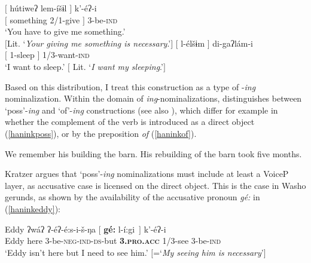 \documentclass[output=paper]{langscibook}
\begin{document}
  \label{haninkgerunds}
 \ea \gll $[$ hútiweʔ lem-íšɨl $]$ k'-éʔ-i\\
$[$ something  2/1-give $]$ 3-be-{\scshape ind}\\
\glt `You have to give me something.' \\ $[$Lit. `{\itshape Your giving me something is necessary}.'$]$ \label{haninkgive}
\vspace{.25em}
 \ex \gll $[$ l-élšɨm $]$ di-gaʔlám-i\\
$[$ 1-sleep $]$ 1/3-want-{\scshape ind}\\
\glt `I want to sleep.' $[$ Lit. `{\itshape I want my sleeping}.'$]$\label{haninksleep}
 \z
 \z 
 
Based on this distribution, I treat this construction as a type of -{\itshape ing} nominalization. Within the domain of {\itshape ing}-nominalizations, \cite{kratzer1996} distinguishes between  `poss'-{\itshape ing} and `of'-{\itshape ing} constructions (see also \citealt{abney1987,alexiadou2005,harley2009}), which differ for example in whether the complement of the verb is introduced as a direct object (\ref{haninkposs}), or by the preposition {\itshape of} (\ref{haninkof}).
 

 \ea  We remember his building the barn. \label{haninkposs} 
 \ex His rebuilding of the barn took five months. \label{haninkof} \hfill \citep[126-127]{kratzer1996}
 \z
 \z
 
Kratzer argues that `poss'-{\itshape ing} nominalizations must include at least a VoiceP layer, as accusative case is licensed on the direct object. This is the case in Washo gerunds, as shown by the availability of the accusative pronoun {\itshape gé:} in (\ref{haninkeddy}):
 
 
 \ea \gll Eddy ʔwáʔ ʔ-éʔ-é:s-i-š-ŋa $[$ {\bfseries gé:} l-í:gi\ $]$ k'-éʔ-i\\
Eddy here 3-be-{\scshape neg-ind-ds}-but {} \textbf{\textsc{3.pro.acc}} 1/3-see 3-be-{\scshape ind}\\
\glt `Eddy isn't here but I need to see him.' $[$=`{\itshape My seeing him is necessary}'$]$\label{haninkeddy}
\z 

\end{document}
